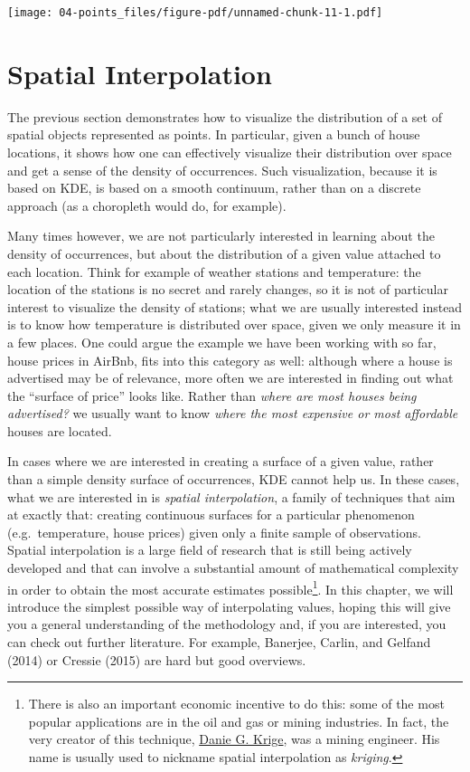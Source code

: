 \documentclass[
  letterpaper,
  DIV=11,
  numbers=noendperiod,
  oneside]{scrreprt}
\begin{document}
\texttt{[image: 04-points\_files/figure-pdf/unnamed-chunk-11-1.pdf]}

\section{Spatial Interpolation}\label{spatial-interpolation}

The previous section demonstrates how to visualize the distribution of a
set of spatial objects represented as points. In particular, given a
bunch of house locations, it shows how one can effectively visualize
their distribution over space and get a sense of the density of
occurrences. Such visualization, because it is based on KDE, is based on
a smooth continuum, rather than on a discrete approach (as a choropleth
would do, for example).

Many times however, we are not particularly interested in learning about
the density of occurrences, but about the distribution of a given value
attached to each location. Think for example of weather stations and
temperature: the location of the stations is no secret and rarely
changes, so it is not of particular interest to visualize the density of
stations; what we are usually interested instead is to know how
temperature is distributed over space, given we only measure it in a few
places. One could argue the example we have been working with so far,
house prices in AirBnb, fits into this category as well: although where
a house is advertised may be of relevance, more often we are interested
in finding out what the ``surface of price'' looks like. Rather than
\emph{where are most houses being advertised?} we usually want to know
\emph{where the most expensive or most affordable} houses are located.

In cases where we are interested in creating a surface of a given value,
rather than a simple density surface of occurrences, KDE cannot help us.
In these cases, what we are interested in is \emph{spatial
interpolation}, a family of techniques that aim at exactly that:
creating continuous surfaces for a particular phenomenon
(e.g.~temperature, house prices) given only a finite sample of
observations. Spatial interpolation is a large field of research that is
still being actively developed and that can involve a substantial amount
of mathematical complexity in order to obtain the most accurate
estimates possible\footnote{There is also an important economic
  incentive to do this: some of the most popular applications are in the
  oil and gas or mining industries. In fact, the very creator of this
  technique, \href{https://en.wikipedia.org/wiki/Danie_G._Krige}{Danie
  G. Krige}, was a mining engineer. His name is usually used to nickname
  spatial interpolation as \emph{kriging}.}. In this chapter, we will
introduce the simplest possible way of interpolating values, hoping this
will give you a general understanding of the methodology and, if you are
interested, you can check out further literature. For example, Banerjee,
Carlin, and Gelfand (2014) or Cressie (2015) are hard but good
overviews.
\end{document}
